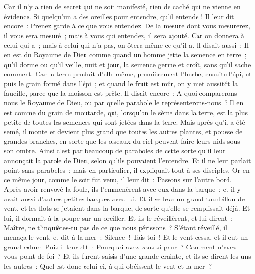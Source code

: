 \begin{multicols}{2}
Car il n'y a rien de secret qui ne soit manifesté, rien de caché qui ne vienne en évidence.
Si quelqu'un a des oreilles pour entendre, qu'il entende !
Il leur dit encore~: Prenez garde à ce que vous entendez. De la mesure dont vous mesurerez, il vous sera mesuré~; mais à vous qui entendez, il sera ajouté.
Car on donnera à celui qui a~; mais à celui qui n'a pas, on ôtera même ce qu'il a.
Il disait aussi~: Il en est du Royaume de Dieu comme quand un homme jette la semence en terre~;
qu'il dorme ou qu'il veille, nuit et jour, la semence germe et croît, sans qu'il sache comment.
Car la terre produit d'elle-même, premièrement l'herbe, ensuite l'épi, et puis le grain formé dans l'épi~;
et quand le fruit est mûr, on y met aussitôt la faucille, parce que la moisson est prête.
Il disait encore~: A quoi comparerons-nous le Royaume de Dieu, ou par quelle parabole le représenterons-nous~?
Il en est comme du grain de moutarde, qui, lorsqu'on le sème dans la terre, est la plus petite de toutes les semences qui sont jetées dans la terre.
Mais après qu'il a été semé, il monte et devient plus grand que toutes les autres plantes, et pousse de grandes branches, en sorte que les oiseaux du ciel peuvent faire leurs nids sous son ombre.
Ainsi c'est par beaucoup de paraboles de cette sorte qu'il leur annonçait la parole de Dieu, selon qu'ils pouvaient l'entendre.
Et il ne leur parlait point sans paraboles~; mais en particulier, il expliquait tout à ses disciples.
Or en ce même jour, comme le soir fut venu, il leur dit~: Passons sur l'autre bord.
Après avoir renvoyé la foule, ils l'emmenèrent avec eux dans la barque~; et il y avait aussi d'autres petites barques avec lui.
Et il se leva un grand tourbillon de vent, et les flots se jetaient dans la barque, de sorte qu'elle se remplissait déjà.
Et lui, il dormait à la poupe sur un oreiller. Et ils le réveillèrent, et lui dirent~: Maître, ne t'inquiètes-tu pas de ce que nous périssons~?
S'étant réveillé, il menaça le vent, et dit à la mer~: Silence~! Tais-toi~! Et le vent cessa, et il eut un grand calme.
Puis il leur dit~: Pourquoi avez-vous si peur~? Comment n'avez-vous point de foi~?
Et ils furent saisis d'une grande crainte, et ils se dirent les uns les autres~: Quel est donc celui-ci, à qui obéissent le vent et la mer~?

\end{multicols}
